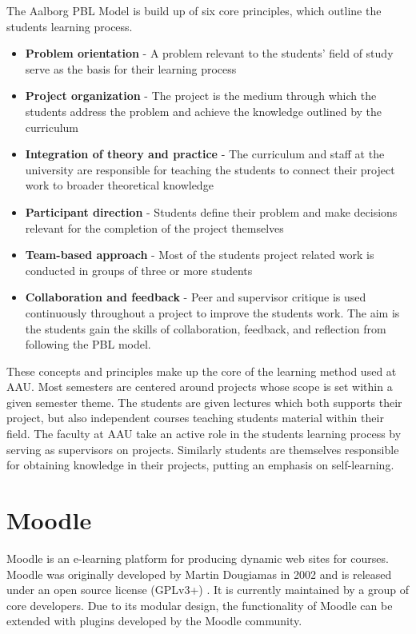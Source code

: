 The Aalborg PBL Model is build up of six core principles, which outline the students learning process.
\begin{itemize}
	\item \textbf{Problem orientation} - A problem relevant to the students' field of study serve as the basis for their learning process
	\item \textbf{Project organization} - The project is the medium through which the students address the problem and achieve the knowledge outlined by the curriculum
	\item \textbf{Integration of theory and practice} - The curriculum and staff at the university are responsible for teaching the students to connect their project work to broader theoretical knowledge
	\item \textbf{Participant direction} - Students define their problem and make decisions relevant for the completion of the project themselves
	\item \textbf{Team-based approach} - Most of the students project related work is conducted in groups of three or more students
	\item \textbf{Collaboration and feedback} - Peer and supervisor critique is used continuously throughout a project to improve the students work. The aim is the students gain the skills of collaboration, feedback, and reflection from following the PBL model. 
\end{itemize}

These concepts and principles make up the core of the learning method used at AAU. Most semesters are centered around projects whose scope is set within a given semester theme. The students are given lectures which both supports their project, but also independent courses teaching students material within their field. The faculty at AAU take an active role in the students learning process by serving as supervisors on projects. Similarly students are themselves responsible for obtaining knowledge in their projects, putting an emphasis on self-learning. 
\section{Moodle}
Moodle is an e-learning platform for producing dynamic web sites for courses. Moodle was originally developed by Martin Dougiamas in 2002 and is released under an open source license (GPLv3+) \citep{gpl}. It is currently maintained by a group of core developers. Due to its modular design, the functionality of Moodle can be extended with plugins developed by the Moodle community.

